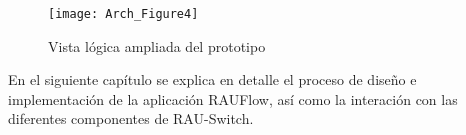 
\newpage
\begin{figure}[ht!] 
\centering    
\texttt{[image: Arch\_Figure4]}
\caption[Vista l\'ogica ampliada del prototipo]{Vista l\'ogica ampliada del prototipo}
\label{fig:OpenSourceRArch4}
\end{figure}

En el siguiente cap\'itulo se explica en detalle el proceso de diseño e implementaci\'on de la aplicaci\'on RAUFlow, as\'i como la interaci\'on con las diferentes componentes de RAU-Switch.
